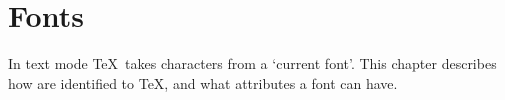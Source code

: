 
\chapter{Fonts}\label{font}

In text mode \TeX\ takes characters from a `current font'.
This chapter describes how  are identified to \TeX,
and what attributes a font can have.

\label{cschap:font}\label{cschap:fontname}\label{cschap:nullfont}\label{cschap:hyphenchar}\label{cschap:defaulthyphenchar}\label{cschap:fontdimen}\label{cschap:char47}\label{cschap:noboundary}
